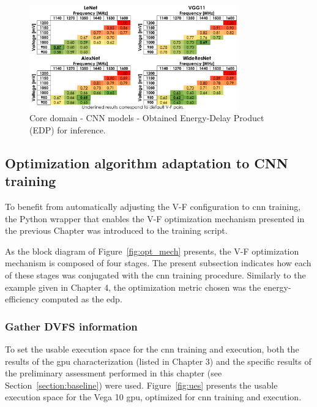\begin{figure}[htb]
    \centering
        \includegraphics[width=0.8\textwidth]{Figures/Application To Deep Learning/CNN_EDP_inf.pdf}
        \caption{Core domain - CNN models - Obtained Energy-Delay Product (EDP) for inference.}
    \label{fig:CNN_EDP_inf}
\end{figure}

\subsection{Optimization algorithm adaptation to CNN training}

To benefit from automatically adjusting the V-F configuration to \acrshort{cnn} training, the Python wrapper that enables the V-F optimization mechanism presented in the previous Chapter was introduced to the training script.

As the block diagram of Figure~\ref{fig:opt_mech} presents, the V-F optimization mechanism is composed of four stages. The present subsection indicates how each of these stages was conjugated with the \acrshort{cnn} training procedure. Similarly to the example given in Chapter 4, the optimization metric chosen was the energy-efficiency computed as the \acrshort{edp}.

\subsubsection{Gather DVFS information}

To set the usable execution space for the \acrshort{cnn} training and execution, both the results of the \acrshort{gpu} characterization (listed in Chapter 3) and the specific results of the preliminary assessment performed in this chapter (see Section~\ref{section:baseline}) were used. Figure~\ref{fig:ues} presents the usable execution space for the Vega 10 \acrshort{gpu}, optimized for  \acrshort{cnn} training and execution.

